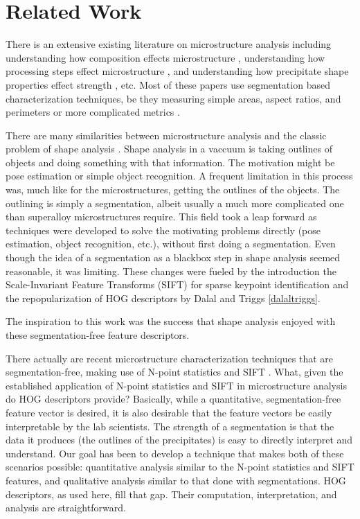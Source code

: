 \documentclass[review]{elsarticle}
\begin{document}
	\section{Related Work}\label{relatedwork}
		There is an extensive existing literature on microstructure analysis including understanding how composition effects microstructure \cite{stin2000} \cite{faehrmann}, understanding how processing steps effect microstructure \cite{gabb2011}, and understanding how precipitate shape properties effect strength \cite{sluytman}, etc. Most of these papers use segmentation based characterization techniques, be they measuring simple areas, aspect ratios, and perimeters \cite{underwood} or more complicated metrics \cite{twoDM, threeDM}.
		
		There are many similarities between microstructure analysis and the classic problem of shape analysis \cite{stegmann} \cite{belongie}. Shape analysis in a vaccuum is taking outlines of objects and doing something with that information. The motivation might be pose estimation \cite{stegmann} or simple object recognition\cite{belongie}. A frequent limitation in this process was, much like for the microstructures, getting the outlines of the objects. The outlining is simply a segmentation, albeit usually a much more complicated one than superalloy microstructures require. This field took a leap forward as techniques were developed to solve the motivating problems directly (pose estimation, object recognition, etc.), without first doing a segmentation. Even though the idea of a segmentation as a blackbox step in shape analysis seemed reasonable, it was limiting. These changes were fueled by the introduction the Scale-Invariant Feature Transforms (SIFT) \cite{sift} for sparse keypoint identification and the repopularization of HOG descriptors by Dalal and Triggs \ref{dalaltriggs}.
		
		The inspiration to this work was the success that shape analysis enjoyed with these segmentation-free feature descriptors.

		There actually are recent microstructure characterization techniques that are segmentation-free, making use of N-point statistics \cite{kalidindi1, kalidindi2} and SIFT \cite{decost}. What, given the established application of N-point statistics and SIFT in microstructure analysis do HOG descriptors provide? Basically, while a quantitative, segmentation-free feature vector is desired, it is also desirable that the feature vectors be easily interpretable by the lab scientists. The strength of a segmentation is that the data it produces (the outlines of the precipitates) is easy to directly interpret and understand. Our goal has been to develop a technique that makes both of these scenarios possible: quantitative analysis similar to the N-point statistics and SIFT features, and qualitative analysis similar to that done with segmentations. HOG descriptors, as used here, fill that gap. Their computation, interpretation, and analysis are straightforward.
	
\end{document}
